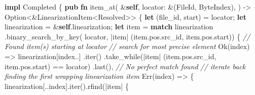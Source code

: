 \documentclass[
  a4paper,
  bibtex,
  english,
  nomenclature]{kthlatex/kththesis/kththesis}
\newenvironment{Shaded}{}{}
\newcommand{\CommentTok}[1]{\textcolor[rgb]{0.38,0.63,0.69}{\textit{#1}}}
\newcommand{\ConstantTok}[1]{\textcolor[rgb]{0.53,0.00,0.00}{#1}}
\newcommand{\DataTypeTok}[1]{\textcolor[rgb]{0.56,0.13,0.00}{#1}}
\newcommand{\KeywordTok}[1]{\textcolor[rgb]{0.00,0.44,0.13}{\textbf{#1}}}
\newcommand{\NormalTok}[1]{#1}
\newcommand{\OperatorTok}[1]{\textcolor[rgb]{0.40,0.40,0.40}{#1}}
\begin{document}
\begin{codelisting}

\caption{Resolution of item at given position}

\hypertarget{lst:nls-resolve-at}{%
\label{lst:nls-resolve-at}}%
\begin{Shaded}
\begin{Highlighting}[]
\KeywordTok{impl}\NormalTok{ Completed }\OperatorTok{\{}
  \KeywordTok{pub} \KeywordTok{fn}\NormalTok{ item\_at(}
    \OperatorTok{\&}\KeywordTok{self}\OperatorTok{,}
\NormalTok{    locator}\OperatorTok{:} \OperatorTok{\&}\NormalTok{(FileId}\OperatorTok{,}\NormalTok{ ByteIndex)}\OperatorTok{,}
\NormalTok{  ) }\OperatorTok{{-}\textgreater{}} \DataTypeTok{Option}\OperatorTok{\textless{}\&}\NormalTok{LinearizationItem}\OperatorTok{\textless{}}\NormalTok{Resolved}\OperatorTok{\textgreater{}\textgreater{}} \OperatorTok{\{}
    \KeywordTok{let}\NormalTok{ (file\_id}\OperatorTok{,}\NormalTok{ start) }\OperatorTok{=}\NormalTok{ locator}\OperatorTok{;}
    \KeywordTok{let}\NormalTok{ linearization }\OperatorTok{=} \OperatorTok{\&}\KeywordTok{self}\OperatorTok{.}\NormalTok{linearization}\OperatorTok{;}
    \KeywordTok{let}\NormalTok{ item }\OperatorTok{=} \KeywordTok{match}\NormalTok{ linearization}
      \OperatorTok{.}\NormalTok{binary\_search\_by\_key(}
\NormalTok{        locator}\OperatorTok{,}
        \OperatorTok{|}\NormalTok{item}\OperatorTok{|}\NormalTok{ (item}\OperatorTok{.}\NormalTok{pos}\OperatorTok{.}\NormalTok{src\_id}\OperatorTok{,}\NormalTok{ item}\OperatorTok{.}\NormalTok{pos}\OperatorTok{.}\NormalTok{start))}
      \OperatorTok{\{}
        \CommentTok{// Found item(s) starting at \textasciigrave{}locator\textasciigrave{}}
        \CommentTok{// search for most precise element}
        \ConstantTok{Ok}\NormalTok{(index) }\OperatorTok{=\textgreater{}}\NormalTok{ linearization[index}\OperatorTok{..}\NormalTok{]}
          \OperatorTok{.}\NormalTok{iter()}
          \OperatorTok{.}\NormalTok{take\_while(}\OperatorTok{|}\NormalTok{item}\OperatorTok{|}\NormalTok{ (item}\OperatorTok{.}\NormalTok{pos}\OperatorTok{.}\NormalTok{src\_id}\OperatorTok{,}\NormalTok{ item}\OperatorTok{.}\NormalTok{pos}\OperatorTok{.}\NormalTok{start) }\OperatorTok{==}\NormalTok{ locator)}
          \OperatorTok{.}\NormalTok{last()}\OperatorTok{,}
        \CommentTok{// No perfect match found}
        \CommentTok{// iterate back finding the first wrapping linearization item}
        \ConstantTok{Err}\NormalTok{(index) }\OperatorTok{=\textgreater{}} \OperatorTok{\{}
\NormalTok{          linearization[}\OperatorTok{..}\NormalTok{index]}\OperatorTok{.}\NormalTok{iter()}\OperatorTok{.}\NormalTok{rfind(}\OperatorTok{|}\NormalTok{item}\OperatorTok{|} \OperatorTok{\{}

\end{Highlighting}
\end{Shaded}
\end{codelisting}
\end{document}
